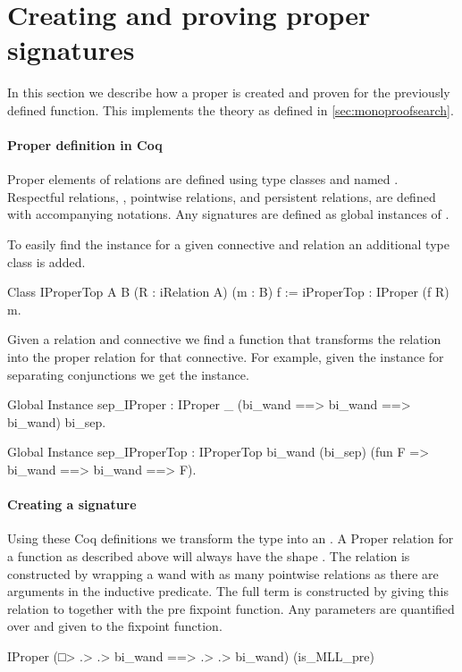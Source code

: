 \documentclass[thesis.tex]{subfiles}
\begin{document}
\section{Creating and proving proper signatures}\label{sec:constrsig}
In this section we describe how a proper is created and proven for the previously defined function. This implements the theory as defined in \cref{sec:monoproofsearch}.

\paragraph{Proper definition in Coq}
Proper elements of relations are defined using type classes and named . Respectful relations, , pointwise relations,  and persistent relations,  are defined with accompanying notations. Any signatures are defined as global instances of .

To easily find the  instance for a given connective and relation an additional type class is added.
\begin{coqcode}
  Class IProperTop {A} {B} 
                   (R : iRelation A) (m : B) 
                   f := iProperTop : IProper (f R) m.
\end{coqcode}
Given a relation  and connective  we find a function  that transforms the relation into the proper relation for that connective. For example, given the  instance for separating conjunctions we get the  instance.
\begin{coqcode}
  Global Instance sep_IProper : 
    IProper _ (bi_wand ==> bi_wand ==> bi_wand) 
             bi_sep.

  Global Instance sep_IProperTop : 
    IProperTop bi_wand (bi_sep) 
               (fun F => bi_wand ==> bi_wand ==> F).
\end{coqcode}

\paragraph{Creating a signature}
Using these Coq definitions we transform the type into an . A Proper relation for a function as described above will always have the shape . The relation  is constructed by wrapping a wand with as many pointwise relations as there are arguments in the inductive predicate. The full  term is constructed by giving this relation to  together with the pre fixpoint function. Any parameters are quantified over and given to the fixpoint function.
\begin{coqcode}
  IProper (□> .> .> bi_wand ==> .> .> bi_wand) 
          (is_MLL_pre)
\end{coqcode}
\end{document}
